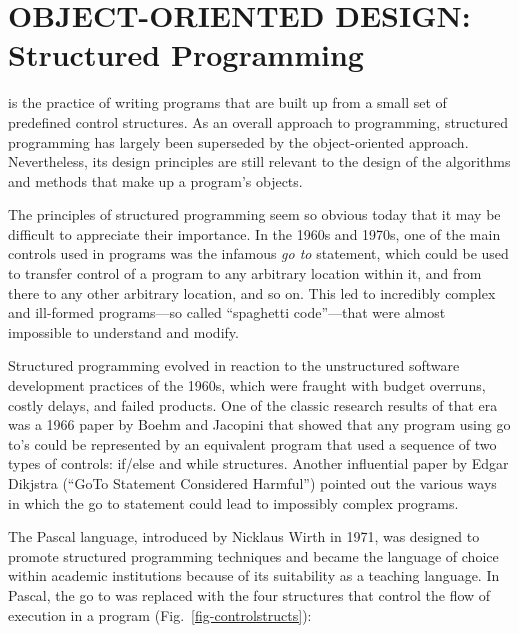 \section{OBJECT-ORIENTED DESIGN: \\Structured Programming}
\label{objectorienteddesign-structured-programming}



\label{mbox-design-structured-programming}
 is the practice of writing programs that
are built up from a small set of predefined control structures. As an
overall approach to programming, structured programming has largely
been superseded by the object-oriented approach. Nevertheless, its
design principles are still relevant to the design of the
algorithms and methods that make up a program's objects.

The principles of structured programming seem so obvious today that it
may be difficult to appreciate their importance. In the 1960s and 1970s,
one of the main controls used in programs was the infamous
{\it go to} statement, which could be used to transfer
control of a program to any arbitrary location within it, and
from there to any other arbitrary location, and so on. This led to
incredibly complex and ill-formed programs---so called ``spaghetti
code''---that were almost impossible to understand and modify.

Structured programming evolved in reaction to the unstructured
software development practices of the 1960s, which were fraught with
budget overruns, costly delays, and failed products. One of the classic
research results of that era was a 1966 paper by Boehm and
Jacopini that showed that any program using go to's
could be represented by an equivalent program that used a sequence of
two types of controls: if/else and while structures. Another
influential paper by Edgar Dikjstra (``GoTo Statement
Considered Harmful'') pointed out the various ways in which the go to statement
could lead to impossibly complex programs.

The Pascal language, introduced by Nicklaus Wirth in 1971, was
designed to promote structured programming techniques and became the
language of choice within academic institutions because of its
suitability as a teaching language. In Pascal, the go to was replaced
with the four structures that control the flow of execution
in a program (Fig.~\ref{fig-controlstructs}):



